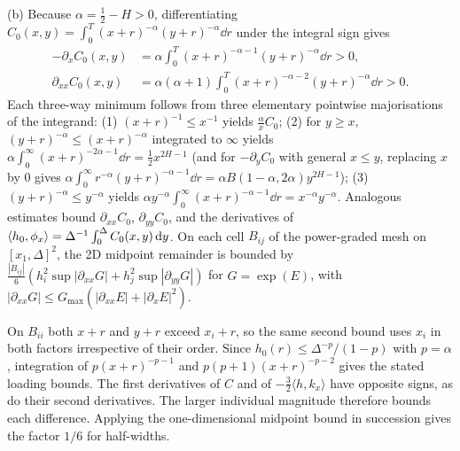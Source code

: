 (b) Because $\alpha=\tfrac12-H>0$, differentiating $C_0(x,y)=\int_0^T(x+r)^{-\alpha}(y+r)^{-\alpha}\dd r$
under the integral sign gives
\[
\begin{aligned}
  -\partial_x C_0(x,y)&=\alpha\int_0^T(x+r)^{-\alpha-1}(y+r)^{-\alpha}\dd r>0,\\
  \partial_{xx}C_0(x,y)&=\alpha(\alpha+1)\int_0^T(x+r)^{-\alpha-2}(y+r)^{-\alpha}\dd r>0.
\end{aligned}
\]
Each three-way minimum follows from three elementary pointwise majorisations of the integrand:
(1) $(x+r)^{-1}\le x^{-1}$ yields $\frac{\alpha}{x}C_0$;
(2) for $y\ge x$, $(y+r)^{-\alpha}\le(x+r)^{-\alpha}$ integrated to $\infty$ yields
$\alpha\int_0^\infty(x+r)^{-2\alpha-1}\dd r=\frac12 x^{2H-1}$ (and for $-\partial_y C_0$ with general
$x\le y$, replacing $x$ by $0$ gives $\alpha\int_0^\infty r^{-\alpha}(y+r)^{-\alpha-1}\dd r=\alpha B(1-\alpha,2\alpha)y^{2H-1}$);
(3) $(y+r)^{-\alpha}\le y^{-\alpha}$ yields $\alpha y^{-\alpha}\int_0^\infty(x+r)^{-\alpha-1}\dd r=x^{-\alpha}y^{-\alpha}$.
Analogous estimates bound $\partial_{xx}C_0$, $\partial_{yy}C_0$, and the derivatives of
$\left\langle h_0,\phi_x\right\rangle=\Delta^{-1}\int_0^\Delta C_0(x,y)\,\mathrm{d} y$. On each cell $B_{ij}$ of the power-graded mesh
on $[x_1,\Delta]^2$, the 2D midpoint remainder is bounded by
$\frac{|B_{ij}|}{6}(h_i^2\sup|\partial_{xx}G|+h_j^2\sup|\partial_{yy}G|)$ for $G=\exp(E)$, with
$|\partial_{xx}G|\le G_{\max}(|\partial_{xx}E|+|\partial_x E|^2)$.

On $B_{ii}$ both $x+r$ and $y+r$ exceed $x_i+r$, so the same second bound uses
$x_i$ in both factors irrespective of their order. Since $h_0(r)\le\Delta^{-p}/(1-p)$
with $p=\alpha$, integration of $p(x+r)^{-p-1}$ and $p(p+1)(x+r)^{-p-2}$
gives the stated loading bounds. The first derivatives of $C$ and of $-\tfrac32\langle
h,k_x\rangle$ have opposite signs, as do their second derivatives. The larger individual
magnitude therefore bounds each difference. Applying the one-dimensional midpoint bound
in succession gives the factor $1/6$ for half-widths.

